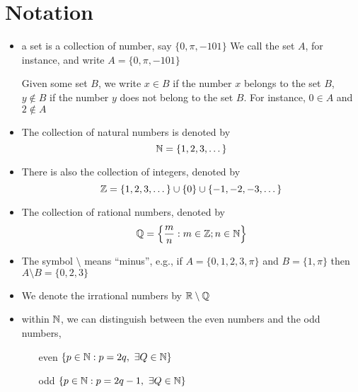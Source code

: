 \section{Notation}
\begin{itemize}
  \item a set is a collection of number, say $\{0, \pi, -101\}$
  We call the set $A$, for instance, and write $A = \{0, \pi, -101\}$

  Given some set $B$, we write $x\in B$ if the number $x$ belongs to the set $B$, 
  $y \notin B$ if the number $y$ does not belong to the set $B$. 
  For instance, $0 \in A$ and $2 \notin A$
  \item The collection of natural numbers is denoted by
  \[\mathbb N = \{1, 2, 3, \dotsc\}\]
  \item There is also the collection of integers, denoted by
  \[\mathbb Z = \{1, 2, 3, \dotsc\} \cup \{0\} \cup \{-1, -2, -3, \dotsc\}\]
  \item The collection of rational numbers, denoted by
  \[\mathbb Q = \left\{\frac{m}{n} : m \in \mathbb Z; n \in \mathbb N\right\}\]
  \item The symbol $\setminus$ means ``minus'', e.g., if $A = \{0, 1, 2, 3, \pi\}$ and $B = \{1, \pi\}$ then $A \setminus B = \{0, 2, 3\}$
  \item We denote the irrational numbers by $\mathbb R \setminus \mathbb Q$
  \item within $\mathbb N$, we can distinguish between the even numbers and the odd numbers, 
  \begin{enumerate}
    \item[even] $\{p\in\mathbb N : p = 2q,\ \exists Q \in \mathbb N\}$
    \item[odd] $\{p\in\mathbb N : p = 2q-1,\ \exists Q \in \mathbb N\}$
  \end{enumerate}
\end{itemize}